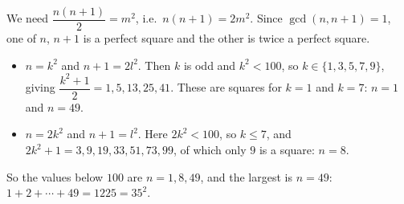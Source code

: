 We need $\dfrac{n(n+1)}{2}=m^2$, i.e.\ $n(n+1)=2m^2$. Since $\gcd(n,n+1)=1$, one of $n$, $n+1$ is a perfect square and the other is twice a perfect square.
\begin{itemize}
\item $n=k^2$ and $n+1=2l^2$. Then $k$ is odd and $k^2<100$, so $k\in\{1,3,5,7,9\}$, giving $\dfrac{k^2+1}{2}=1,5,13,25,41$. These are squares for $k=1$ and $k=7$: $n=1$ and $n=49$.
\item $n=2k^2$ and $n+1=l^2$. Here $2k^2<100$, so $k\le7$, and $2k^2+1=3,9,19,33,51,73,99$, of which only $9$ is a square: $n=8$.
\end{itemize}
So the values below $100$ are $n=1,8,49$, and the largest is $n=\boxed{49}$: $1+2+\cdots+49=1225=35^2$.
